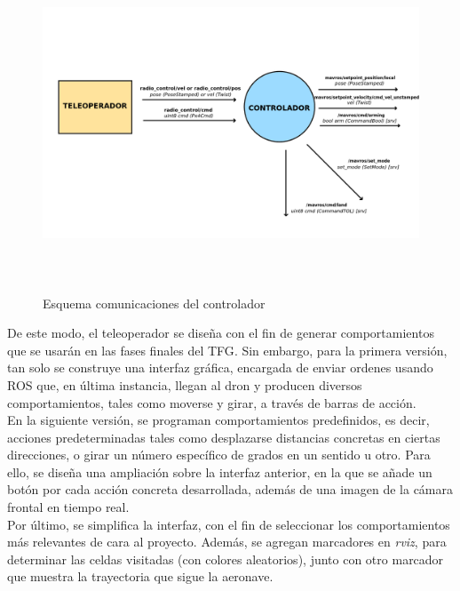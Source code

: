 \begin{figure} [H]
	\begin{center}
	\includegraphics[height=10cm]{imagenes/cap4/4_esquema_coms.png}
	\end{center}
	\caption[Esquema comunicaciones del controlador]{Esquema comunicaciones del controlador}
	\label{fig:diagrama}
\end{figure}

De este modo, el teleoperador se diseña con el fin de generar comportamientos que se usarán en las fases finales del \ac{TFG}. Sin embargo, para la primera versión, tan solo se construye una interfaz gráfica, encargada de enviar ordenes usando \ac{ROS} que, en última instancia, llegan al dron y producen diversos comportamientos, tales como moverse y girar, a través de barras de acción.\\

En la siguiente versión, se programan comportamientos predefinidos, es decir, acciones predeterminadas tales como desplazarse distancias concretas en ciertas direcciones, o girar un número específico de grados en un sentido u otro. Para ello, se diseña una ampliación sobre la interfaz anterior, en la que se añade un botón por cada acción concreta desarrollada, además de una imagen de la cámara frontal en tiempo real.\\

Por último, se simplifica la interfaz, con el fin de seleccionar los comportamientos más relevantes de cara al proyecto. Además, se agregan marcadores en \emph{rviz}, para determinar las celdas visitadas (con colores aleatorios), junto con otro marcador que muestra la trayectoria que sigue la aeronave.\\

